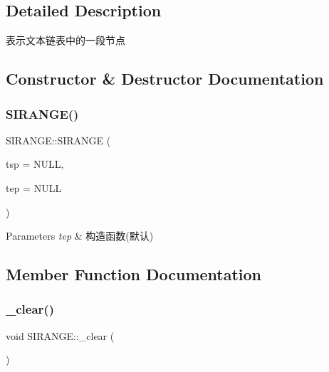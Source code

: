 \subsection{Detailed Description}
表示文本链表中的一段节点 

\subsection{Constructor \& Destructor Documentation}
\mbox{\label{struct_s_i_r_a_n_g_e_a7c9322d5aec16acda0c4b95a9d48891a}} 
\subsubsection{\texorpdfstring{S\+I\+R\+A\+N\+G\+E()}{SIRANGE()}}
{\footnotesize\ttfamily S\+I\+R\+A\+N\+G\+E\+::\+S\+I\+R\+A\+N\+GE (\begin{DoxyParamCaption}\item[{\hyperlink{class_s_i_c_h_a_r_n_o_d_e}{S\+I\+C\+H\+A\+R\+N\+O\+D\+E\+\_\+P}}]{tsp = {\ttfamily NULL},  }\item[{\hyperlink{class_s_i_c_h_a_r_n_o_d_e}{S\+I\+C\+H\+A\+R\+N\+O\+D\+E\+\_\+P}}]{tep = {\ttfamily NULL} }\end{DoxyParamCaption})\hspace{0.3cm}{\ttfamily [inline]}}


\begin{DoxyParams}{Parameters}
{\em tep} & 构造函数(默认) \\
\hline
\end{DoxyParams}


\subsection{Member Function Documentation}
\mbox{\label{struct_s_i_r_a_n_g_e_afa57adc9093ce9213bedf4bb4c74310a}} 
\subsubsection{\texorpdfstring{\+\_\+clear()}{\_clear()}}
{\footnotesize\ttfamily void S\+I\+R\+A\+N\+G\+E\+::\+\_\+clear (\begin{DoxyParamCaption}{ }\end{DoxyParamCaption})\hspace{0.3cm}{\ttfamily [inline]}}



